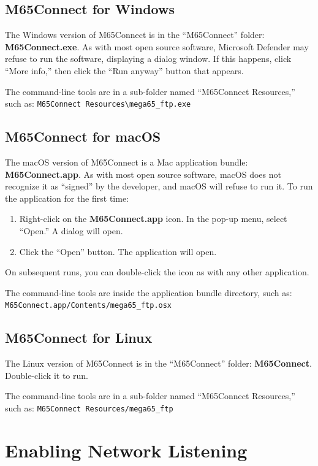 \subsection{M65Connect for Windows}

The Windows version of M65Connect is in the ``M65Connect'' folder: {\bf M65Connect.exe}. As with most open source software, Microsoft Defender may refuse to run the software, displaying a dialog window. If this happens, click ``More info,'' then click the ``Run anyway'' button that appears.

The command-line tools are in a sub-folder named ``M65Connect Resources,'' such as: {\tt M65Connect Resources\textbackslash{}mega65\_ftp.exe}

\subsection{M65Connect for macOS}

The macOS version of M65Connect is a Mac application bundle: {\bf M65Connect.app}. As with most open source software, macOS does not recognize it as ``signed'' by the developer, and macOS will refuse to run it. To run the application for the first time:

\begin{enumerate}
\item Right-click on the {\bf M65Connect.app} icon. In the pop-up menu, select ``Open.'' A dialog will open.
\item Click the ``Open'' button. The application will open.
\end{enumerate}

On subsequent runs, you can double-click the icon as with any other application.

The command-line tools are inside the application bundle directory, such as: {\tt M65Connect.app/Contents/mega65\_ftp.osx}

\subsection{M65Connect for Linux}

The Linux version of M65Connect is in the ``M65Connect'' folder: {\bf M65Connect}. Double-click it to run.

The command-line tools are in a sub-folder named ``M65Connect Resources,'' such as: {\tt M65Connect Resources/mega65\_ftp}

\section{Enabling Network Listening}

